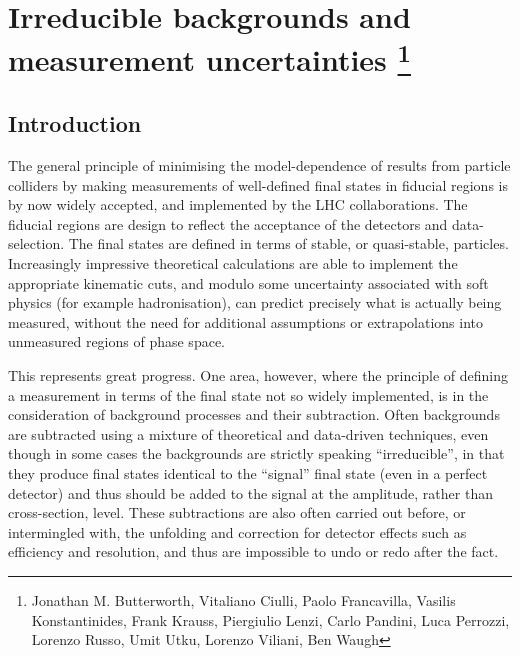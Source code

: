 \documentclass[11pt]{cernrep}
\begin{document}
 
\section{Irreducible backgrounds and measurement uncertainties \protect\footnote{Jonathan M. Butterworth, Vitaliano Ciulli, Paolo
  Francavilla, Vasilis Konstantinides, Frank Krauss, Piergiulio Lenzi, Carlo Pandini, Luca Perrozzi, Lorenzo Russo, Umit
  Utku, Lorenzo Viliani, Ben Waugh}}



\subsection{Introduction}
\label{sec:intro}

The general principle of minimising the model-dependence of results from particle colliders by making measurements of 
well-defined final states in fiducial regions is by now widely accepted, and implemented by the LHC collaborations. 
The fiducial regions are design to reflect  the acceptance of the detectors and data-selection. 
The final states are defined in terms of stable, or quasi-stable,
particles. Increasingly impressive theoretical calculations are able to implement the appropriate kinematic cuts, and
modulo some uncertainty associated with soft physics (for example hadronisation), can predict precisely what 
is actually being measured, without the need for additional assumptions or extrapolations into unmeasured regions of 
phase space.

This represents great progress. One area, however, where the principle of defining a measurement in terms of the final state
not so widely implemented, is in the consideration of background processes and their subtraction. 
Often backgrounds are subtracted using a mixture of theoretical and data-driven techniques, 
even though in some cases the backgrounds are strictly speaking ``irreducible'', in that they produce final states 
identical to the ``signal'' final state (even in a perfect detector) and thus should be added to the signal 
at the amplitude, rather than cross-section, level. These subtractions are also often carried out before, or intermingled with, 
the unfolding and correction for detector effects such as efficiency and resolution, and thus are impossible to
undo or redo after the fact. 
\end{document}
